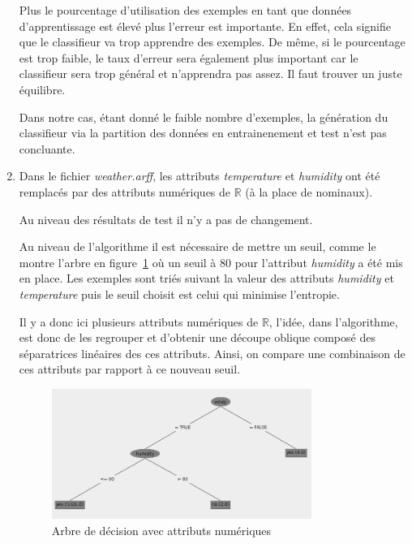 \documentclass[a4paper]{article}
\begin{document}
\begin{enumerate}
Plus le pourcentage d'utilisation des exemples en tant que données d'apprentissage est élevé plus l'erreur est importante. En effet, cela signifie que le classifieur va trop apprendre des exemples. De même, si le pourcentage est trop faible, le taux d'erreur sera également plus important car le classifieur sera trop général et n'apprendra pas assez. Il faut trouver un juste équilibre.

Dans notre cas, étant donné le faible nombre d'exemples, la génération du classifieur via la partition des données en entrainenement et test n'est pas concluante.

\item Dans le fichier \textit{weather.arff}, les attributs \textit{temperature} et \textit{humidity} ont été remplacés par des attributs numériques de $\mathbb{R}$ (à la place de nominaux).

Au niveau des résultats de test il n'y a pas de changement. 


Au niveau de l'algorithme il est nécessaire de mettre un seuil, comme le montre l'arbre en figure~\ref{fig:ArbreSeuil} où un seuil à 80 pour l'attribut \textit{humidity} a été mis en place.
Les exemples sont triés suivant la valeur des attributs \textit{humidity} et \textit{temperature} puis le seuil choisit est celui qui minimise l'entropie.


Il y a donc ici plusieurs attributs numériques de $\mathbb{R}$, l'idée, dans l'algorithme, est donc de les regrouper et d'obtenir une découpe oblique composé des séparatrices linéaires des ces attributs. Ainsi, on compare une combinaison de ces attributs par rapport à ce nouveau seuil.

\begin{figure}[h]
	  \begin{center}
	    \includegraphics[width=0.8\textwidth]{ArbreSeuil.png}
	    \caption{Arbre de décision avec attributs numériques}
	    \label{fig:ArbreSeuil} 
	  \end{center}
	\end{figure}

\end{enumerate}
\end{document}
